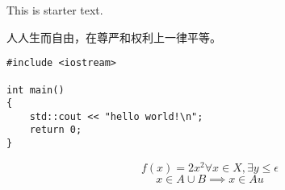 \documentclass{article}
\begin{document}
This is starter text.
\begin{CJK}{UTF8}{min}
人人生而自由，在尊严和权利上一律平等。
\end{CJK}
\begin{verbatim}
#include <iostream>

int main()
{
    std::cout << "hello world!\n";
    return 0;
} 
\end{verbatim}

\begin{equation*}
f(x) = 2x^2
\forall x \in X, \exists y \leq \epsilon
\end{equation*}
\begin{equation*}
x \in A \cup B \implies x \in A u
\end{equation*}
\end{document}
